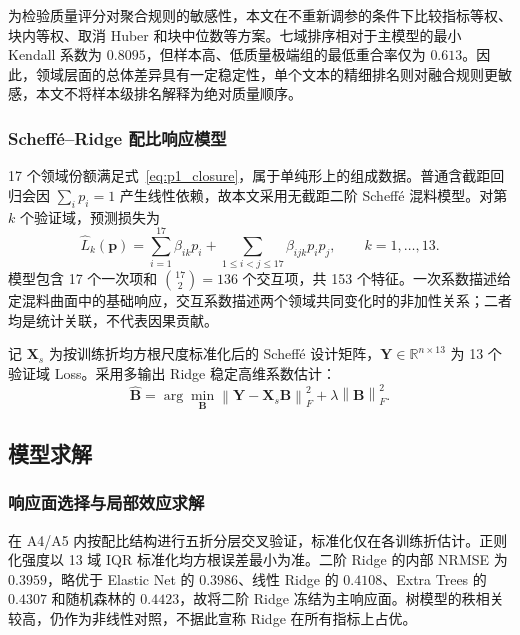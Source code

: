 为检验质量评分对聚合规则的敏感性，本文在不重新调参的条件下比较指标等权、块内等权、取消 Huber 和块中位数等方案。七域排序相对于主模型的最小 Kendall 系数为 $0.8095$，但样本高、低质量极端组的最低重合率仅为 $0.613$。因此，领域层面的总体差异具有一定稳定性，单个文本的精细排名则对融合规则更敏感，本文不将样本级排名解释为绝对质量顺序。

\subsubsection{Scheff\'e--Ridge 配比响应模型}

17 个领域份额满足式~\eqref{eq:p1_closure}，属于单纯形上的组成数据。普通含截距回归会因 $\sum_i p_i=1$ 产生线性依赖，故本文采用无截距二阶 Scheff\'e 混料模型\cite{scheffe1958mixtures}。对第 $k$ 个验证域，预测损失为
\begin{equation}
\widehat L_k(\boldsymbol p)
=\sum_{i=1}^{17}\beta_{ik}p_i
+\sum_{1\le i<j\le17}\beta_{ijk}p_ip_j,
\qquad k=1,\ldots,13.
\label{eq:p1_scheffe}
\end{equation}
模型包含 17 个一次项和 $\binom{17}{2}=136$ 个交互项，共 153 个特征。一次系数描述给定混料曲面中的基础响应，交互系数描述两个领域共同变化时的非加性关系；二者均是统计关联，不代表因果贡献。

记 $\boldsymbol X_s$ 为按训练折均方根尺度标准化后的 Scheff\'e 设计矩阵，$\boldsymbol Y\in\mathbb R^{n\times13}$ 为 13 个验证域 Loss。采用多输出 Ridge 稳定高维系数估计\cite{hoerl1970ridge}：
\begin{equation}
\widehat{\boldsymbol B}
=\arg\min_{\boldsymbol B}
\left\|\boldsymbol Y-\boldsymbol X_s\boldsymbol B\right\|_F^2
+\lambda\left\|\boldsymbol B\right\|_F^2.
\label{eq:p1_ridge}
\end{equation}
\subsection{模型求解}

\subsubsection{响应面选择与局部效应求解}

在 A4/A5 内按配比结构进行五折分层交叉验证，标准化仅在各训练折估计。正则化强度以 13 域 IQR 标准化均方根误差最小为准。二阶 Ridge 的内部 NRMSE 为 $0.3959$，略优于 Elastic Net 的 $0.3986$、线性 Ridge 的 $0.4108$、Extra Trees 的 $0.4307$ 和随机森林的 $0.4423$，故将二阶 Ridge 冻结为主响应面。树模型的秩相关较高，仍作为非线性对照，不据此宣称 Ridge 在所有指标上占优。

